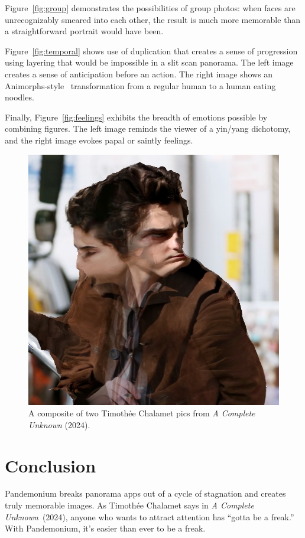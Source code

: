 \documentclass[twocolumn]{article}
\begin{document}
Figure~\ref{fig:group} demonstrates the possibilities of group photos: when faces are unrecognizably smeared into each other, the result is much more memorable than a straightforward portrait would have been.

Figure~\ref{fig:temporal} shows use of duplication that creates a sense of progression using layering that would be impossible in a slit scan panorama. The left image creates a sense of anticipation before an action. The right image shows an Animorphs-style~\cite{hollister-2019} transformation from a regular human to a human eating noodles.

Finally, Figure~\ref{fig:feelings} exhibits the breadth of emotions possible by combining figures. The left image reminds the viewer of a yin/yang dichotomy, and the right image evokes papal or saintly feelings.

\begin{figure}
    \centering
    \includegraphics[width=0.48\linewidth]{img/timothee.png}
    \caption{A composite of two Timoth\'ee Chalamet pics from \textit{A Complete Unknown} (2024).}
    \label{fig:timothee}
\end{figure}


\section{Conclusion}

Pandemonium breaks panorama apps out of a cycle of stagnation and creates truly memorable images. As Timoth\'ee Chalamet says in \textit{A Complete Unknown}~(2024), anyone who wants to attract attention has ``gotta be a freak.''~\cite{completeunknown} With Pandemonium, it's easier than ever to be a freak.
\end{document}
